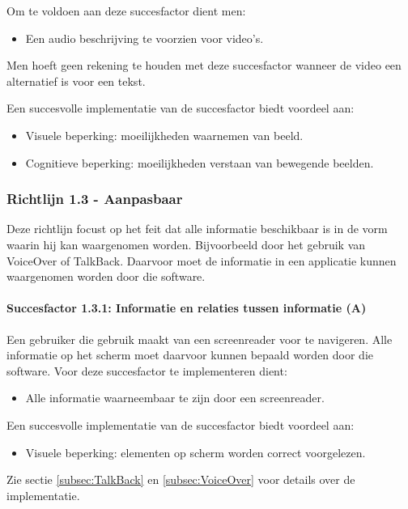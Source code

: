 Om te voldoen aan deze succesfactor dient men: 
\begin{itemize}
    \item Een audio beschrijving te voorzien voor video's.
    
\end{itemize}
Men hoeft geen rekening te houden met deze succesfactor wanneer de video een alternatief is voor een tekst.

Een succesvolle implementatie van de succesfactor biedt voordeel aan:
\begin{itemize}
    \item Visuele beperking: moeilijkheden waarnemen van beeld.
    \item Cognitieve beperking: moeilijkheden verstaan van bewegende beelden.
\end{itemize}

\subsubsection{Richtlijn 1.3 - Aanpasbaar}
Deze richtlijn focust op het feit dat alle informatie beschikbaar is in de vorm waarin hij kan waargenomen worden. Bijvoorbeeld door het gebruik van VoiceOver of TalkBack. Daarvoor moet de informatie in een applicatie kunnen waargenomen worden door die software.
\paragraph{Succesfactor 1.3.1:  Informatie en relaties tussen informatie (A)}
Een gebruiker die gebruik maakt van een screenreader voor te navigeren. Alle informatie op het scherm moet daarvoor kunnen bepaald worden door die software. Voor deze succesfactor te implementeren dient:
\begin{itemize}
    \item Alle informatie waarneembaar te zijn door een screenreader.
\end{itemize}
Een succesvolle implementatie van de succesfactor biedt voordeel aan:
\begin{itemize}
    \item Visuele beperking: elementen op scherm worden correct voorgelezen.
\end{itemize}
Zie sectie \ref{subsec:TalkBack} en \ref{subsec:VoiceOver} voor details over de implementatie.


